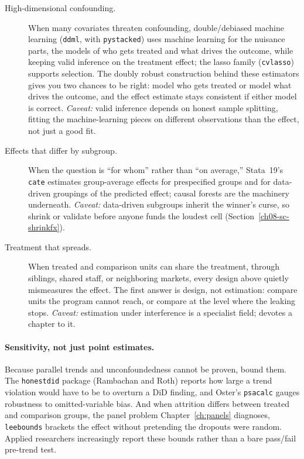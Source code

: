 \documentclass[
    a4paper,
    fontsize=10pt,
    twoside=true,
    numbers=noenddot,
]{kaobook}
\begin{document}
\begin{description}
    \item[High-dimensional confounding.] When many covariates threaten confounding, double/debiased machine learning (\texttt{ddml}, with \texttt{pystacked}) uses machine learning for the nuisance parts, the models of who gets treated and what drives the outcome, while keeping valid inference on the treatment effect; the lasso family (\texttt{cvlasso}) supports selection. The doubly robust construction behind these estimators gives you two chances to be right: model who gets treated or model what drives the outcome, and the effect estimate stays consistent if either model is correct. \emph{Caveat:} valid inference depends on honest sample splitting, fitting the machine-learning pieces on different observations than the effect, not just a good fit.
    \item[Effects that differ by subgroup.] When the question is \enquote{for whom} rather than \enquote{on average,} Stata~19's \texttt{cate} estimates group-average effects for prespecified groups and for data-driven groupings of the predicted effect; causal forests \parencite{wager2018forests} are the machinery underneath. \emph{Caveat:} data-driven subgroups inherit the winner's curse, so shrink or validate before anyone funds the loudest cell (Section~\ref{ch08-sc-shrinkfx}).
    \item[Treatment that spreads.] When treated and comparison units can share the treatment, through siblings, shared staff, or neighboring markets, every design above quietly mismeasures the effect. The first answer is design, not estimation: compare units the program cannot reach, or compare at the level where the leaking stops. \emph{Caveat:} estimation under interference is a specialist field; \textcite{huber2023causal} devotes a chapter to it.
\end{description}

\paragraph{Sensitivity, not just point estimates.} Because parallel trends and unconfoundedness cannot be proven, bound them. The \texttt{honestdid} package (Rambachan and Roth) reports how large a trend violation would have to be to overturn a DiD finding, and Oster's \texttt{psacalc} gauges robustness to omitted-variable bias. And when attrition differs between treated and comparison groups, the panel problem Chapter~\ref{ch:panels} diagnoses, \texttt{leebounds} \parencite{lee2009bounds,tauchmann2014leebounds} brackets the effect without pretending the dropouts were random. Applied researchers increasingly report these bounds rather than a bare pass/fail pre-trend test.
\end{document}
